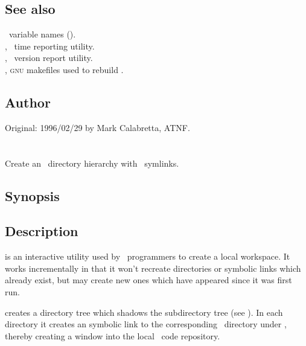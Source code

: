 \subsection*{See also}
 
\aipspp\ variable names ().\\
, \aipspp\ time reporting utility.\\
, \aipspp\ version report utility.\\
, \textsc{gnu} makefiles used to rebuild \aipspp.
 
\subsection*{Author}
 
Original: 1996/02/29 by Mark Calabretta, ATNF.


\newpage
\section{}
\label{mktree}

Create an \aipspp\ directory hierarchy with \rcs\ symlinks.

\subsection*{Synopsis}

\begin{synopsis}
\end{synopsis}

\subsection*{Description}

 is an interactive utility used by \aipspp\ programmers to
create a local workspace.  It works incrementally in that it won't recreate
directories or symbolic links which already exist, but may create new ones
which have appeared since it was first run.

 creates a directory tree which shadows the 
subdirectory tree (see ).  In each directory it creates an
 symbolic link to the corresponding \rcs\ directory under
, thereby creating a window into the local \aipspp\ code
repository.

